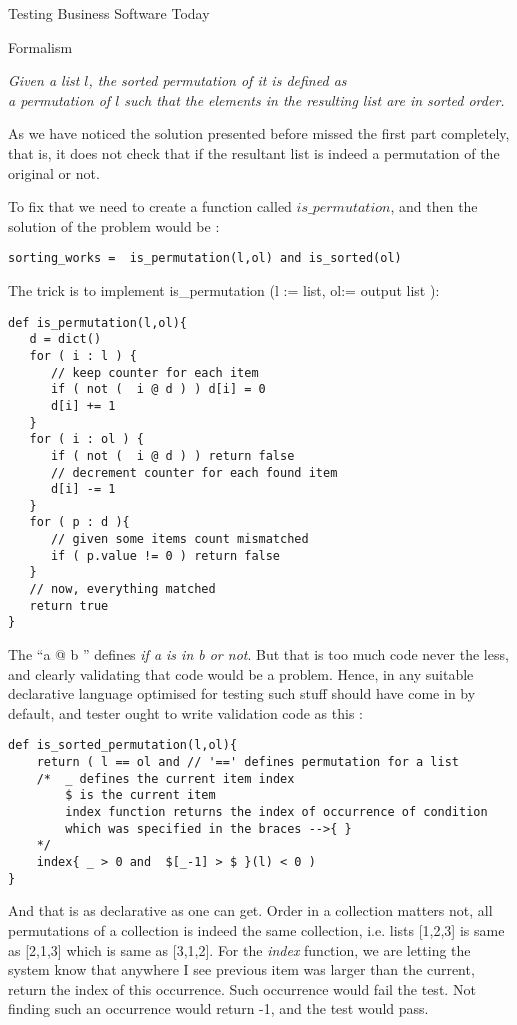 \begin{section}{Testing Business Software Today}
\begin{subsection}{Formalism}
\begin{center}
\emph{ Given a list $l$, the sorted permutation of it is defined as \\ a permutation of $l$ such that the elements in the resulting list are in sorted order.}
\end{center}

As we have noticed the solution presented before missed the first part completely, that is, it does not check that if the resultant list is indeed a permutation of the original or not.

To fix that we need to create a function called $is\_permutation$, and then the solution of the problem would be :

\begin{lstlisting}[style=JexlStyle]
sorting_works =  is_permutation(l,ol) and is_sorted(ol) 
\end{lstlisting}

The trick is to implement is\_permutation (l := list, ol:= output list ):

\begin{lstlisting}[style=JexlStyle]
def is_permutation(l,ol){
   d = dict()
   for ( i : l ) {
      // keep counter for each item 
      if ( not (  i @ d ) ) d[i] = 0 
      d[i] += 1  
   }
   for ( i : ol ) {
      if ( not (  i @ d ) ) return false 
      // decrement counter for each found item 
      d[i] -= 1  
   }
   for ( p : d ){
      // given some items count mismatched 
      if ( p.value != 0 ) return false 
   }
   // now, everything matched 
   return true 
}
\end{lstlisting}

The ``a @ b ''  defines \emph{ if a is in b or not}. But that is too much code never the less, and clearly validating that code would be a problem. Hence, in any suitable declarative language optimised for testing such stuff should have come in by default, and tester ought to write validation code as this :

\begin{lstlisting}[style=JexlStyle]
def is_sorted_permutation(l,ol){
    return ( l == ol and // '==' defines permutation for a list 
    /*  _ defines the current item index 
        $ is the current item 
        index function returns the index of occurrence of condition 
        which was specified in the braces -->{ }
    */
    index{ _ > 0 and  $[_-1] > $ }(l) < 0 )
}
\end{lstlisting}

And that is as declarative as one can get. Order in a collection matters not, all permutations of a collection is indeed the same collection, i.e. lists [1,2,3] is same as [2,1,3] which is same as [3,1,2]. For the \emph{index} function, we are letting the system know that anywhere I see previous item was larger than the current, return the index of this occurrence. Such occurrence would fail the test. Not finding such an occurrence would return -1, and the test would pass.


\end{subsection}
\end{section}
